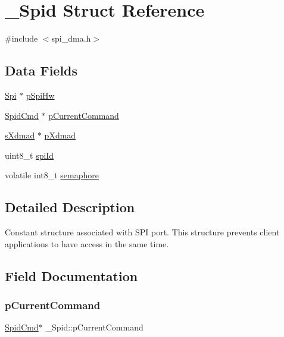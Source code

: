 \hypertarget{struct__Spid}{}\section{\+\_\+\+Spid Struct Reference}
\label{struct__Spid}


{\ttfamily \#include $<$spi\+\_\+dma.\+h$>$}

\subsection*{Data Fields}
\begin{DoxyCompactItemize}
\item 
\mbox{\hyperlink{structSpi}{Spi}} $\ast$ \mbox{\hyperlink{struct__Spid_aa046dd759912f39b616863926db26b47}{p\+Spi\+Hw}}
\item 
\mbox{\hyperlink{spi__dma_8h_a8bc9732eedc1e8f02a7bfaf99d97837b}{Spid\+Cmd}} $\ast$ \mbox{\hyperlink{struct__Spid_a599aacc5ba96bb46abc3b2544645e527}{p\+Current\+Command}}
\item 
\mbox{\hyperlink{group__dmad__structs_gaf2c13151514615a6beb35c0d868a5053}{s\+Xdmad}} $\ast$ \mbox{\hyperlink{struct__Spid_ac3ece7ebbc89a2c505a826c96fd031dc}{p\+Xdmad}}
\item 
uint8\+\_\+t \mbox{\hyperlink{struct__Spid_aaf4a3132d4eea5819a631a76228036f4}{spi\+Id}}
\item 
volatile int8\+\_\+t \mbox{\hyperlink{struct__Spid_ada6512a0b9e6ce08abef0b8eb7020f65}{semaphore}}
\end{DoxyCompactItemize}


\subsection{Detailed Description}
Constant structure associated with S\+PI port. This structure prevents client applications to have access in the same time. 

\subsection{Field Documentation}
\mbox{\label{struct__Spid_a599aacc5ba96bb46abc3b2544645e527}} 
\subsubsection{\texorpdfstring{pCurrentCommand}{pCurrentCommand}}
{\footnotesize\ttfamily \mbox{\hyperlink{spi__dma_8h_a8bc9732eedc1e8f02a7bfaf99d97837b}{Spid\+Cmd}}$\ast$ \+\_\+\+Spid\+::p\+Current\+Command}

